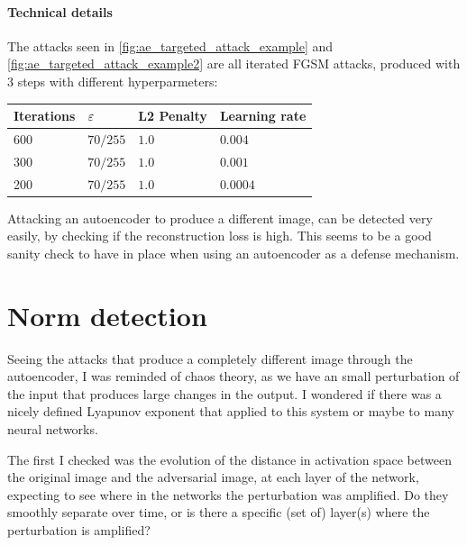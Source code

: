 \documentclass[]{scrarticle}
\begin{document}
\paragraph{Technical details}
The attacks seen in \autoref{fig:ae_targeted_attack_example} and
\ref{fig:ae_targeted_attack_example2}
 are all iterated FGSM attacks,
produced with 3 steps with different hyperparmeters:
\begin{center}
  \begin{tabular}{llll}
    Iterations & $\varepsilon$ & L2 Penalty & Learning rate \\
    \hline
    600 & $70 / 255$ & $1.0$ & $0.004$ \\
    300 & $70 / 255$ & $1.0$ & $0.001$ \\
    200 & $70 / 255$ & $1.0$ & $0.0004$ \\
  \end{tabular}
\end{center}


\begin{remark}
  Attacking an autoencoder to produce a different image, can be detected
  very easily, by checking if the reconstruction loss is high.
  This seems to be a good sanity check to have in place when using
  an autoencoder as a defense mechanism.
\end{remark}

\clearpage
\section{Norm detection}

Seeing the attacks that produce a completely different image
through the autoencoder, I was reminded of chaos theory,
as we have an small perturbation of the input that produces
large changes in the output.
I wondered if there was a nicely defined Lyapunov exponent
that applied to this system or maybe to many neural networks.

The first I checked was the evolution of the distance in
activation space between the original image and the adversarial image,
at each layer of the network, expecting to see where in
the networks the perturbation was amplified. Do they smoothly
separate over time, or is there a specific (set of) layer(s)
where the perturbation is amplified?
\end{document}
